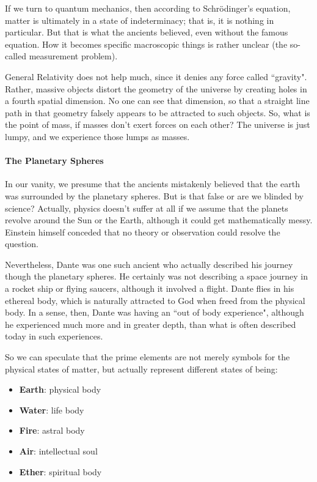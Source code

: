 If we turn to quantum mechanics, then according to Schrödinger's equation, matter is ultimately in a state of indeterminacy; that is, it is nothing in particular. But that is what the ancients believed, even without the famous equation. How it becomes specific macroscopic things is rather unclear (the so-called measurement problem).

General Relativity does not help much, since it denies any force called ``gravity". Rather, massive objects distort the geometry of the universe by creating holes in a fourth spatial dimension. No one can see that dimension, so that a straight line path in that geometry falsely appears to be attracted to such objects. So, what is the point of mass, if masses don't exert forces on each other? The universe is just lumpy, and we experience those lumps as masses.

\paragraph{The Planetary Spheres}
In our vanity, we presume that the ancients mistakenly believed that the earth was surrounded by the planetary spheres. But is that false or are we blinded by science? Actually, physics doesn't suffer at all if we assume that the planets revolve around the Sun or the Earth, although it could get mathematically messy. Einstein himself conceded that no theory or observation could resolve the question.

Nevertheless, Dante was one such ancient who actually described his journey though the planetary spheres. He certainly was not describing a space journey in a rocket ship or flying saucers, although it involved a flight. Dante flies in his ethereal body, which is naturally attracted to God when freed from the physical body. In a sense, then, Dante was having an ``out of body experience", although he experienced much more and in greater depth, than what is often described today in such experiences.

So we can speculate that the prime elements are not merely symbols for the physical states of matter, but actually represent different states of being:

\begin{itemize}
\item \textbf{Earth}: physical body 
\item \textbf{Water}: life body 
\item \textbf{Fire}: astral body 
\item \textbf{Air}: intellectual soul 
\item \textbf{Ether}: spiritual body 
\end{itemize}


